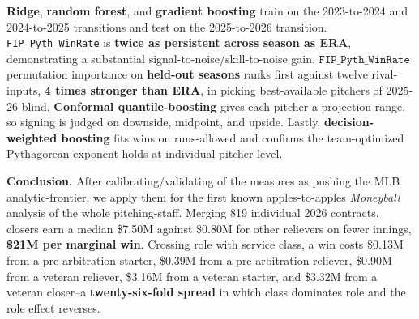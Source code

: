 \documentclass[11pt]{article}
\begin{document}
\textbf{Ridge}, \textbf{random forest}, and \textbf{gradient boosting} train on the 2023-to-2024 and 2024-to-2025 transitions and test on the 2025-to-2026 transition. \texttt{FIP\_Pyth\_WinRate} is \textbf{twice as persistent across season as ERA}, demonstrating a substantial signal-to-noise/skill-to-noise gain. $\texttt{FIP\_Pyth\_WinRate}$ permutation importance on \textbf{held-out seasons} ranks first against twelve rival-inputs, \textbf{4 times stronger than ERA}, in picking best-available pitchers of 2025-26 blind. \textbf{Conformal quantile-boosting} gives each pitcher a projection-range, so signing is judged on downside, midpoint, and upside. Lastly, \textbf{decision-weighted boosting} fits wins on runs-allowed and confirms the team-optimized Pythagorean exponent holds at individual pitcher-level.

\textbf{Conclusion.} After calibrating/validating of the measures as pushing the MLB analytic-frontier, we apply them for the first known apples-to-apples \emph{Moneyball} analysis of the whole pitching-staff. Merging 819 individual 2026 contracts, closers earn a median \$7.50M against \$0.80M for other
relievers on fewer innings, \textbf{\$21M per marginal win}. Crossing role with service class, a win costs
\$0.13M from a pre-arbitration starter, \$0.39M from a pre-arbitration reliever, \$0.90M from a
veteran reliever, \$3.16M from a veteran starter, and \$3.32M from a veteran closer--a
\textbf{twenty-six-fold spread} in which class dominates role and the role effect reverses. %
%
%
\end{document}
